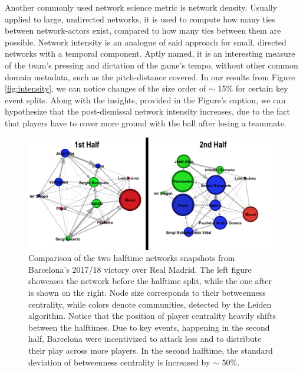 \documentclass[9pt,twocolumn,twoside]{pnas-report}
\begin{document}
Another commonly used network science metric is network density. Usually applied to large, undirected networks, it is used to compute how many ties between network-actors exist, compared to how many ties between them are possible. Network intensity is an analogue of said approach for small, directed networks with a temporal component. Aptly named, it is an interesting measure of the team's pressing and dictation of the game's tempo, without other common domain metadata, such as the pitch-distance covered. In our results from Figure \ref{fig:intensity}, we can notice changes of the size order of $\sim$ 15\% for certain key event splits. Along with the insights, provided in the Figure's caption, we can hypothesize that the post-dismissal network intensity increases, due to the fact that players have to cover more ground with the ball after losing a teammate. 

\begin{figure}[t]\centering
	\includegraphics[width=\linewidth]{BarcaHalves.png}
	\caption{Comparison of the two halftime networks snapshots from Barcelona's 2017/18 victory over Real Madrid. The left figure showcases the network before the halftime split, while the one after is shown on the right. Node size corresponds to their betweenness centrality, while colors denote communities, detected by the Leiden algorithm. Notice that the position of player centrality heavily shifts between the halftimes. Due to key events, happening in the second half, Barcelona were incentivized to attack less and to distribute their play across more players. In the second halftime, the standard deviation of betweenness centrality is increased by $\sim$ 50\%.}
	\label{fig:BarcaHalves}
\end{figure}
\end{document}
